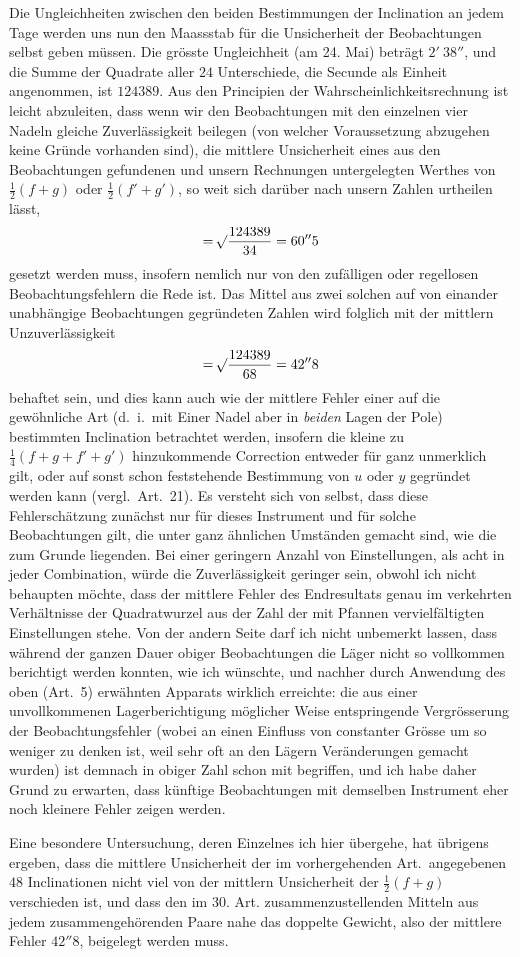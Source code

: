 Die Ungleichheiten zwischen den beiden Bestimmungen der Inclination an jedem Tage werden uns nun den Maassstab für die Unsicherheit der Beobachtungen selbst geben müssen. Die grösste Ungleichheit (am 24. Mai) beträgt $2'\ 38''$, und die Summe der Quadrate aller $24$ Unterschiede, die Secunde als Einheit angenommen, ist $124389$. Aus den Principien der Wahrscheinlichkeitsrechnung ist leicht abzuleiten, dass wenn wir den Beobachtungen mit den einzelnen vier Nadeln gleiche Zuverlässigkeit beilegen (von welcher Voraussetzung abzugehen keine Gründe vorhanden sind), die mittlere Unsicherheit eines aus den Beobachtungen gefundenen und unsern Rechnungen untergelegten Werthes von $\tfrac12(f+g)$ oder $\tfrac12(f'+g')$, so weit sich darüber nach unsern Zahlen urtheilen lässt,
\[
=\mathord{{}^{}\!\surd}\frac{124389}{34}=60''5
\]
gesetzt werden muss, insofern nemlich nur von den zufälligen oder regellosen Beobachtungsfehlern die Rede ist. Das Mittel aus zwei solchen auf von einander unabhängige Beobachtungen gegründeten Zahlen wird folglich mit der mittlern Unzuverlässigkeit
\[
=\mathord{{}^{}\!\surd}\frac{124389}{68}=42''8
\]
behaftet sein, und dies kann auch wie der mittlere Fehler einer auf die gewöhnliche Art (d.\ i.\ mit Einer Nadel aber in \textit{beiden} Lagen der Pole) bestimmten Inclination betrachtet werden, insofern die kleine zu $\tfrac14(f+g+f'+g')$ hinzukommende Correction entweder für ganz unmerklich gilt, oder auf sonst schon feststehende Bestimmung von $u$ oder $y$ gegründet werden kann (vergl.\ Art.\ 21). Es versteht sich von selbst, dass diese Fehlerschätzung zunächst nur für dieses Instrument und für solche Beobachtungen gilt, die unter ganz ähnlichen Umständen gemacht sind, wie die zum Grunde liegenden. Bei einer geringern Anzahl von Einstellungen, als acht in jeder Combination, würde die Zuverlässigkeit geringer sein, obwohl ich nicht behaupten möchte, dass der mittlere Fehler des Endresultats genau im verkehrten Verhältnisse der Quadratwurzel aus der Zahl der mit Pfannen vervielfältigten Einstellungen stehe. Von der andern Seite darf ich nicht unbemerkt lassen, dass während der ganzen Dauer obiger Beobachtungen die Läger nicht so vollkommen berichtigt werden konnten, wie ich wünschte, und nachher durch Anwendung des oben (Art.\ 5) erwähnten Apparats wirklich erreichte: die aus einer unvollkommenen Lagerberichtigung möglicher Weise entspringende Vergrösserung der Beobachtungsfehler (wobei an einen Einfluss von constanter Grösse um so weniger zu denken ist, weil sehr oft an den Lägern Veränderungen gemacht wurden) ist demnach in obiger Zahl schon mit begriffen, und ich habe daher Grund zu erwarten, dass künftige Beobachtungen mit demselben Instrument eher noch kleinere Fehler zeigen werden.

Eine besondere Untersuchung, deren Einzelnes ich hier übergehe, hat übrigens ergeben, dass die mittlere Unsicherheit der im vorhergehenden Art.\ angegebenen $48$ Inclinationen nicht viel von der mittlern Unsicherheit der $\tfrac12(f+g)$ verschieden ist, und dass den im 30. Art. zusammenzustellenden Mitteln aus jedem zusammengehörenden Paare nahe das doppelte Gewicht, also der mittlere Fehler $42''8$, beigelegt werden muss.
